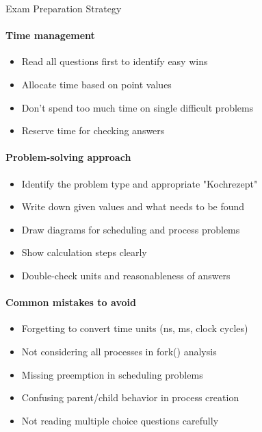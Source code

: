 \begin{KR}{Exam Preparation Strategy}
    \paragraph{Time management}
    \begin{itemize}
        \item Read all questions first to identify easy wins
        \item Allocate time based on point values
        \item Don't spend too much time on single difficult problems
        \item Reserve time for checking answers
    \end{itemize}
    
    \paragraph{Problem-solving approach}
    \begin{itemize}
        \item Identify the problem type and appropriate "Kochrezept"
        \item Write down given values and what needs to be found
        \item Draw diagrams for scheduling and process problems
        \item Show calculation steps clearly
        \item Double-check units and reasonableness of answers
    \end{itemize}
    
    \paragraph{Common mistakes to avoid}
    \begin{itemize}
        \item Forgetting to convert time units (ns, ms, clock cycles)
        \item Not considering all processes in fork() analysis
        \item Missing preemption in scheduling problems
        \item Confusing parent/child behavior in process creation
        \item Not reading multiple choice questions carefully
    \end{itemize}
\end{KR}